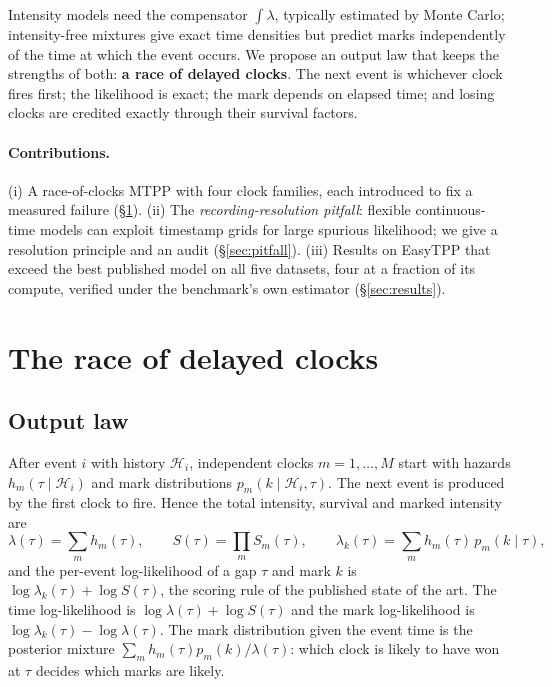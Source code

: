 \documentclass[11pt]{article}
\begin{document}
Intensity models need the compensator $\int \lambda$, typically estimated by Monte Carlo; intensity-free mixtures give exact time densities but predict marks independently of the time at which the event occurs. We propose an output law that keeps the strengths of both: \textbf{a race of delayed clocks}. The next event is whichever clock fires first; the likelihood is exact; the mark depends on elapsed time; and losing clocks are credited exactly through their survival factors.

\paragraph{Contributions.}
(i) A race-of-clocks MTPP with four clock families, each introduced to fix a measured failure (\S\ref{sec:model}).
(ii) The \emph{recording-resolution pitfall}: flexible continuous-time models can exploit timestamp grids for large spurious likelihood; we give a resolution principle and an audit (\S\ref{sec:pitfall}).
(iii) Results on EasyTPP that exceed the best published model on all five datasets, four at a fraction of its compute, verified under the benchmark's own estimator (\S\ref{sec:results}).

\section{The race of delayed clocks}\label{sec:model}
\subsection{Output law}
After event $i$ with history $\mathcal{H}_i$, independent clocks $m=1,\dots,M$ start with hazards $h_m(\tau\mid\mathcal{H}_i)$ and mark distributions $p_m(k\mid\mathcal{H}_i,\tau)$. The next event is produced by the first clock to fire. Hence the total intensity, survival and marked intensity are
\begin{equation}
\lambda(\tau)=\sum_m h_m(\tau),\qquad S(\tau)=\prod_m S_m(\tau),\qquad \lambda_k(\tau)=\sum_m h_m(\tau)\,p_m(k\mid\tau),
\end{equation}
and the per-event log-likelihood of a gap $\tau$ and mark $k$ is $\log\lambda_k(\tau)+\log S(\tau)$, the scoring rule of the published state of the art. The time log-likelihood is $\log\lambda(\tau)+\log S(\tau)$ and the mark log-likelihood is $\log\lambda_k(\tau)-\log\lambda(\tau)$. The mark distribution given the event time is the posterior mixture $\sum_m h_m(\tau)p_m(k)/\lambda(\tau)$: which clock is likely to have won at $\tau$ decides which marks are likely.
\end{document}
